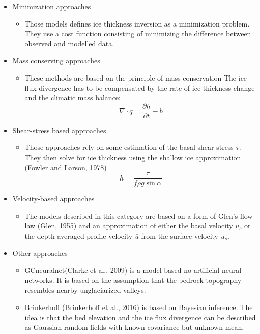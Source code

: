 \documentclass[a4, 12pt]{article}
\begin{document}
\begin{itemize}
	\item Minimization approaches
		\begin{itemize}
			\item Those models defines ice thickness inversion as a minimization problem. They use a cost 					function consisting of minimizing the difference between observed and modelled data. 	
		\end{itemize}
	\item Mass conserving approaches
		\begin{itemize}
			\item These methods are based on the principle of mass conservation \cite{farinotti2016accurate} The 						ice flux divergence has to be compensated by the rate of ice thickness change and the 						climatic mass balance:
				\[\nabla \cdot q = \frac{\partial h}{\partial t} - \dot{b}\]
		\end{itemize}
	\item Shear-stress based approaches
		\begin{itemize}
			\item Those approaches rely on some estimation of the basal shear stress $\tau$. They then 					solve for ice thickness using the shallow ice approximation (Fowler and Larson, 1978)
			\[h = \frac{\tau}{f\rho g \sin{\alpha}}\]
		\end{itemize}
	\item Velocity-based approaches
		\begin{itemize}
			\item The models described in this category are based on a form of Glen's flow law (Glen, 					1955) and an approximation of either the basal velocity $u_b$ or the depth-averaged profile 				velocity $\bar{u}$ from the surface velocity $u_s$.
		\end{itemize} 
	\item Other approaches
		\begin{itemize}
			\item GCneuralnet(Clarke et al., 2009) is a model based no artificial neural networks. It is based on the assumption that the bedrock topography resembles nearby unglaciarized valleys.
			\item Brinkerhoff (Brinkerhoff et al., 2016) is based on Bayesian inference. The idea is that the bed elevation and the ice flux divergence can be described as Gaussian random fields with known covariance but unknown mean.
		\end{itemize}		
\end{itemize}
\end{document}
